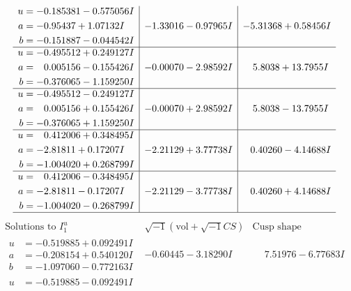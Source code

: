 \documentclass[1p]{elsarticle_modified}
\theoremstyle{definition}
\newcommand{\I}{\sqrt{-1}}
\begin{document}
$$\begin{array}{c|c|c}
\begin{aligned}
u &= -0.185381 - 0.575056 I \\
a &= -0.95437 + 1.07132 I \\
b &= -0.151887 - 0.044542 I\end{aligned}
 & -1.33016 - 0.97965 I & -5.31368 + 0.58456 I \\ \hline\begin{aligned}
u &= -0.495512 + 0.249127 I \\
a &= \phantom{-}0.005156 - 0.155426 I \\
b &= -0.376065 - 1.159250 I\end{aligned}
 & -0.00070 - 2.98592 I & \phantom{-}5.8038 + 13.7955 I \\ \hline\begin{aligned}
u &= -0.495512 - 0.249127 I \\
a &= \phantom{-}0.005156 + 0.155426 I \\
b &= -0.376065 + 1.159250 I\end{aligned}
 & -0.00070 + 2.98592 I & \phantom{-}5.8038 - 13.7955 I \\ \hline\begin{aligned}
u &= \phantom{-}0.412006 + 0.348495 I \\
a &= -2.81811 + 0.17207 I \\
b &= -1.004020 + 0.268799 I\end{aligned}
 & -2.21129 + 3.77738 I & \phantom{-}0.40260 - 4.14688 I \\ \hline\begin{aligned}
u &= \phantom{-}0.412006 - 0.348495 I \\
a &= -2.81811 - 0.17207 I \\
b &= -1.004020 - 0.268799 I\end{aligned}
 & -2.21129 - 3.77738 I & \phantom{-}0.40260 + 4.14688 I\\
 \hline 
 \end{array}$$\newpage$$\begin{array}{c|c|c}  
\text{Solutions to }I^u_{1}& \I (\text{vol} + \sqrt{-1}CS) & \text{Cusp shape}\\
 \hline 
\begin{aligned}
u &= -0.519885 + 0.092491 I \\
a &= -0.208154 + 0.540120 I \\
b &= -1.097060 - 0.772163 I\end{aligned}
 & -0.60445 - 3.18290 I & \phantom{-}7.51976 - 6.77683 I \\ \hline\begin{aligned}
u &= -0.519885 - 0.092491 I \\

\end{aligned}
\end{array}$$
\end{document}
